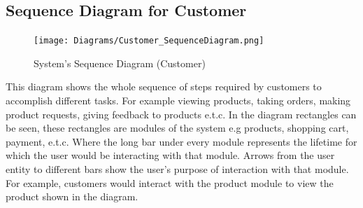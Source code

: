 \subsection{Sequence Diagram for Customer}
\begin{figure}[H]
    \centering
    \texttt{[image: Diagrams/Customer\_SequenceDiagram.png]}
    \caption{System’s Sequence Diagram (Customer)}
    \label{fig: System’s Sequence Diagram (Customer)}
\end{figure}
\justifying
This diagram shows the whole sequence of steps required by customers to accomplish different tasks. For example viewing products, taking orders, making product requests, giving feedback to products e.t.c. In the diagram rectangles can be seen, these rectangles are modules of the system e.g products, shopping cart, payment, e.t.c. Where the long bar under every module represents the lifetime for which the user would be  interacting with that module. Arrows from the user entity to different bars show the user’s purpose of interaction with that module. For example, customers would interact with the product module to view the product shown in the diagram.